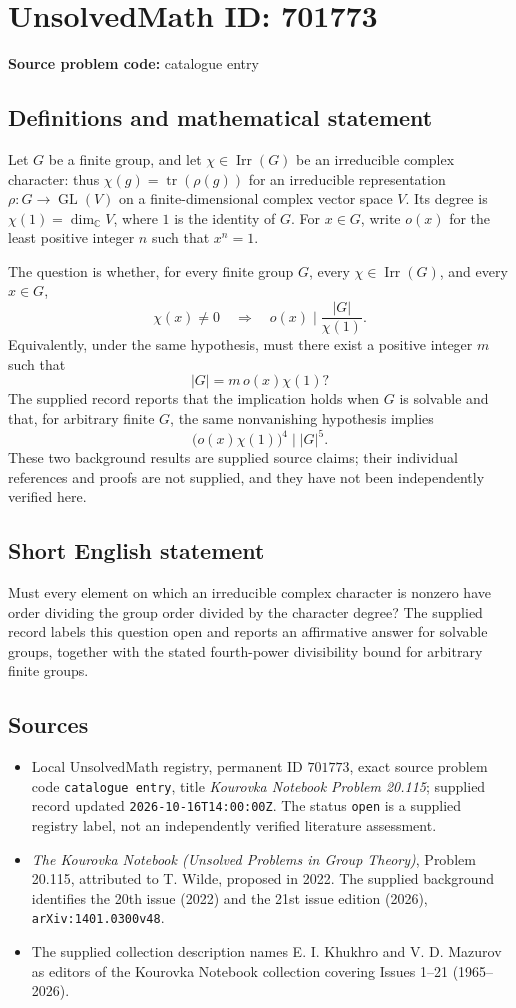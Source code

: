 \documentclass[11pt]{article}
\newcommand{\C}{\mathbb{C}}
\begin{document}
\section*{UnsolvedMath ID: 701773}
\textbf{Source problem code:} catalogue entry
\subsection{Definitions and mathematical statement}
Let \(G\) be a finite group, and let \(\chi\in\operatorname{Irr}(G)\) be an irreducible complex character: thus \(\chi(g)=\operatorname{tr}(\rho(g))\) for an irreducible representation \(\rho:G\to\operatorname{GL}(V)\) on a finite-dimensional complex vector space \(V\). Its degree is \(\chi(1)=\dim_{\C}V\), where \(1\) is the identity of \(G\). For \(x\in G\), write \(o(x)\) for the least positive integer \(n\) such that \(x^n=1\).

The question is whether, for every finite group \(G\), every \(\chi\in\operatorname{Irr}(G)\), and every \(x\in G\),
\[
\chi(x)\ne 0\quad\Longrightarrow\quad o(x)\mid\frac{|G|}{\chi(1)}.
\]
Equivalently, under the same hypothesis, must there exist a positive integer \(m\) such that
\[
|G|=m\,o(x)\chi(1)?
\]
The supplied record reports that the implication holds when \(G\) is solvable and that, for arbitrary finite \(G\), the same nonvanishing hypothesis implies
\[
\bigl(o(x)\chi(1)\bigr)^4\mid |G|^5.
\]
These two background results are supplied source claims; their individual references and proofs are not supplied, and they have not been independently verified here.
\subsection{Short English statement}
Must every element on which an irreducible complex character is nonzero have order dividing the group order divided by the character degree? The supplied record labels this question open and reports an affirmative answer for solvable groups, together with the stated fourth-power divisibility bound for arbitrary finite groups.
\subsection{Sources}
\begin{itemize}
\item Local UnsolvedMath registry, permanent ID \(701773\), exact source problem code \texttt{catalogue entry}, title \emph{Kourovka Notebook Problem 20.115}; supplied record updated \texttt{2026-10-16T14:00:00Z}. The status \texttt{open} is a supplied registry label, not an independently verified literature assessment.
\item \emph{The Kourovka Notebook (Unsolved Problems in Group Theory)}, Problem 20.115, attributed to T. Wilde, proposed in 2022. The supplied background identifies the 20th issue (2022) and the 21st issue edition (2026), \texttt{arXiv:1401.0300v48}.
\item The supplied collection description names E. I. Khukhro and V. D. Mazurov as editors of the Kourovka Notebook collection covering Issues 1--21 (1965--2026).
\end{itemize}
\end{document}
